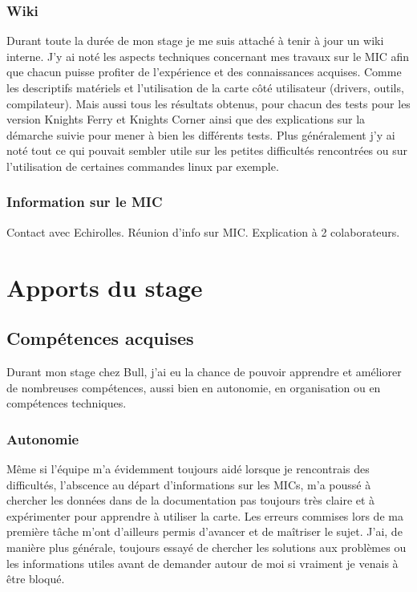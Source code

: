 \documentclass[11pt]{article}
\begin{document}
			\subsubsection{Wiki}
			Durant toute la durée de mon stage je me suis attaché à tenir à jour un wiki interne. J'y ai noté les aspects techniques 
			concernant mes travaux sur le MIC afin que chacun puisse profiter de l'expérience et des connaissances acquises. 
			Comme les descriptifs matériels et l'utilisation de la carte côté utilisateur (drivers, outils, compilateur).
			Mais aussi tous les résultats obtenus, pour chacun des tests pour les version Knights Ferry et Knights Corner ainsi 
			que des explications sur la démarche suivie pour mener à bien les différents tests. \newline
			Plus généralement j'y ai noté tout ce qui pouvait sembler utile sur les petites difficultés rencontrées ou sur l'utilisation 
			de certaines commandes linux par exemple.
			\subsubsection{Information sur le MIC}
			Contact avec Echirolles. \newline
			Réunion d'info sur MIC. \newline
			Explication à 2 colaborateurs. \newline
	\section{Apports du stage}
		\subsection{Compétences acquises}
		Durant mon stage chez Bull, j'ai eu la chance de pouvoir apprendre et améliorer de nombreuses compétences, aussi bien 
		en autonomie, en organisation ou en compétences techniques.
			\subsubsection{Autonomie}
			Même si l'équipe m'a évidemment toujours aidé lorsque je rencontrais des difficultés, l'abscence au départ 
			d'informations sur les MICs, m'a poussé à chercher les données dans de la documentation pas toujours très claire et à 
			expérimenter pour apprendre à utiliser la carte. Les erreurs commises lors de ma première tâche m'ont d'ailleurs permis d'avancer 
			et de maîtriser le sujet. J'ai, de manière plus générale, toujours essayé de chercher les solutions aux problèmes ou les 
			informations utiles avant de demander autour de moi si vraiment je venais à être bloqué.
\end{document}

